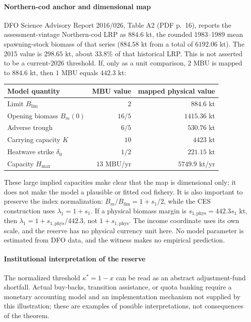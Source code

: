 \paragraph{Northern-cod anchor and dimensional map} DFO Science Advisory Report 2016/026, Table A2 (PDF p.~16), reports the assessment-vintage Northern-cod LRP as $884.6$ kt, the rounded 1983--1989 mean spawning-stock biomass of that series ($884.58$ kt from a total of $6192.06$ kt). The 2015 value is $298.65$ kt, about $33.8\%$ of that historical LRP. This is not asserted to be a current-2026 threshold. If, only as a unit comparison, $2$ MBU is mapped to $884.6$ kt, then $1$ MBU equals $442.3$ kt:
\begin{center}\small
\begin{tabular}{@{}lrr@{}}\toprule
Model quantity & MBU value & mapped physical value \\
\midrule
Limit $B_{\mathrm{lim}}$ & $2$ & $884.6$ kt \\
Opening biomass $B_m(0)$ & $16/5$ & $1415.36$ kt \\
Adverse trough & $6/5$ & $530.76$ kt \\
Carrying capacity $K$ & $10$ & $4423$ kt \\
Heatwave strike $\delta_0$ & $1/2$ & $221.15$ kt \\
Capacity $H_{\max}$ & $13$ MBU/yr & $5749.9$ kt/yr \\
\bottomrule\end{tabular}
\end{center}
These large implied capacities make clear that the map is dimensional only; it does not make the model a plausible or fitted cod fishery. It is also important to preserve the index normalization: $B_m/B_{\mathrm{lim}}=1+s_1/2$, while the CES construction uses $\lambda_1=1+s_1$. If a physical biomass margin is $s_{1,\mathrm{phys}}=442.3s_1$ kt, then $\lambda_1=1+s_{1,\mathrm{phys}}/442.3$, not $1+s_{1,\mathrm{phys}}$. The income coordinate uses its own scale, and the reserve has no physical currency unit here. No model parameter is estimated from DFO data, and the witness makes no empirical prediction.

\paragraph{Institutional interpretation of the reserve} The normalized threshold $\kappa^*=1-x$ can be read as an abstract adjustment-fund shortfall. Actual buy-backs, transition assistance, or quota banking require a monetary accounting model and an implementation mechanism not supplied by this illustration; these are examples of possible interpretations, not consequences of the theorem.

